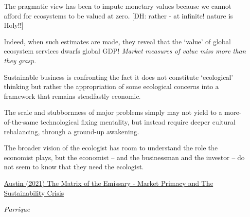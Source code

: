 \documentclass[
]{book}
\begin{document}
The pragmatic view has been to impute monetary values because we cannot afford for ecosystems to be valued at zero. {[}DH: rather - at infinite! nature is Holy!!{]}

Indeed, when such estimates are made, they reveal that the `value' of global ecosystem services dwarfs global GDP! \emph{Market measures of value miss more than they grasp.}

Sustainable business is confronting the fact it does not constitute `ecological' thinking but rather the appropriation of some ecological concerns into a framework that remains steadfastly economic.

The scale and stubbornness of major problems simply may not yield to a more-of-the-same technological fixing mentality, but instead require deeper cultural rebalancing, through a ground-up awakening.

The broader vision of the ecologist has room to understand the role the economist plays, but the economist -- and the businessman and the investor -- do not seem to know that they need the ecologist.

\href{https://channelmcgilchrist.com/articles/the-matrix-of-the-emissary/}{Austin (2021) The Matrix of the Emissary - Market Primacy and The Sustainability Crisis}

\emph{Parrique}
\end{document}
